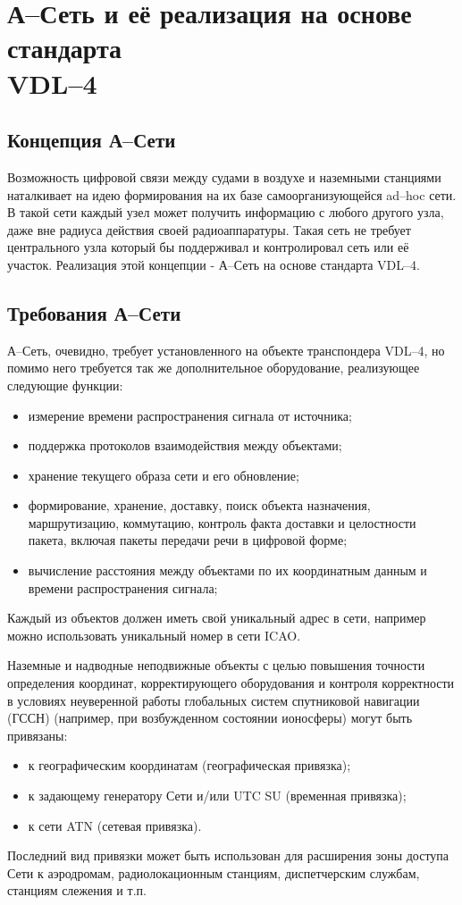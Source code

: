 \documentclass[a4paper,12pt]{report} %
\begin{document}
\chapter{А--Сеть и её реализация на основе стандарта \\
 VDL--4} %

\section{Концепция А--Сети}

Возможность цифровой связи между судами в воздухе и наземными станциями
наталкивает на идею формирования на их базе самоорганизующейся ad--hoc сети. В
такой сети каждый узел может получить информацию с любого другого узла, даже вне
радиуса действия своей радиоаппаратуры. Такая сеть не требует центрального узла
который бы поддерживал и контролировал сеть или её участок. Реализация этой
концепции - А--Сеть на основе стандарта VDL--4. \cite{theconcept}

\section{Требования А--Сети}

А--Сеть, очевидно, требует установленного на объекте транспондера VDL--4, но
помимо него требуется так же дополнительное оборудование, реализующее следующие
функции:
\begin{itemize}
\item измерение времени распространения сигнала от источника;
\item поддержка протоколов взаимодействия между объектами;
\item хранение текущего образа сети и его обновление;
\item формирование, хранение, доставку, поиск объекта назначения, маршрутизацию,
  коммутацию, контроль факта доставки и целостности пакета, включая пакеты
  передачи речи в цифровой форме;
\item вычисление расстояния между объектами по их координатным данным и времени
  распространения сигнала;
\end{itemize}

Каждый из объектов должен иметь свой уникальный адрес в сети, например можно
использовать уникальный номер в сети ICAO.

Наземные и надводные неподвижные объекты с целью повышения точности определения
координат, корректирующего оборудования и контроля корректности в условиях
неуверенной работы глобальных систем спутниковой навигации (ГССН) (например, при
возбужденном состоянии ионосферы) могут быть привязаны:
\begin{itemize}
\item к географическим координатам (географическая привязка);
\item к задающему генератору Сети и/или UTC SU (временная привязка);
\item к сети ATN (сетевая привязка).
\end{itemize}
Последний вид привязки может быть использован для расширения зоны доступа
Сети к аэродромам, радиолокационным станциям, диспетчерским службам, станциям
слежения и т.п.
\end{document}
